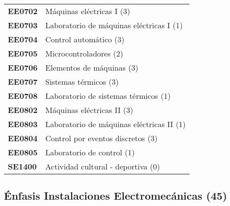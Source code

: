 \documentclass[letterpaper]{article}%
\begin{document}
\begin{tabularx}{\textwidth}{p{1.5cm}p{10cm}}
\textbf{EE0702}&Máquinas eléctricas I (3)\\%
\textbf{EE0703}&Laboratorio de máquinas eléctricas I (1)\\%
\textbf{EE0704}&Control automático (3)\\%
\textbf{EE0705}&Microcontroladores (2)\\%
\textbf{EE0706}&Elementos de máquinas (3)\\%
\textbf{EE0707}&Sistemas térmicos (3)\\%
\textbf{EE0708}&Laboratorio de sistemas térmicos (1)\\%
\textbf{EE0802}&Máquinas eléctricas II (3)\\%
\textbf{EE0803}&Laboratorio de máquinas eléctricas II (1)\\%
\textbf{EE0804}&Control por eventos discretos (3)\\%
\textbf{EE0805}&Laboratorio de control (1)\\%
\textbf{SE1400}&Actividad cultural {-} deportiva (0)\\%
\end{tabularx}

%
\subsection*{Énfasis Instalaciones Electromecánicas (45)}%
\label{subsec:nfasisInstalacionesElectromecnicas(45)}%
\end{document}
